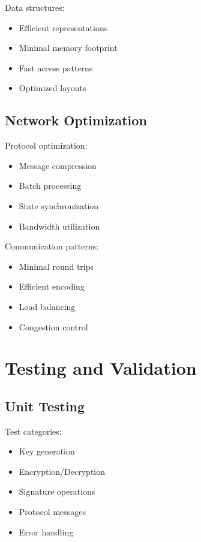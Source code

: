 \documentclass[12pt]{article}
\begin{document}
Data structures:

\begin{itemize}
\item Efficient representations
\item Minimal memory footprint
\item Fast access patterns
\item Optimized layouts
\end{itemize}

\subsection{Network Optimization}

Protocol optimization:

\begin{itemize}
\item Message compression
\item Batch processing
\item State synchronization
\item Bandwidth utilization
\end{itemize}

Communication patterns:

\begin{itemize}
\item Minimal round trips
\item Efficient encoding
\item Load balancing
\item Congestion control
\end{itemize}

\section{Testing and Validation}

\subsection{Unit Testing}

Test categories:

\begin{itemize}
\item Key generation
\item Encryption/Decryption
\item Signature operations
\item Protocol messages
\item Error handling
\end{itemize}
\end{document}

